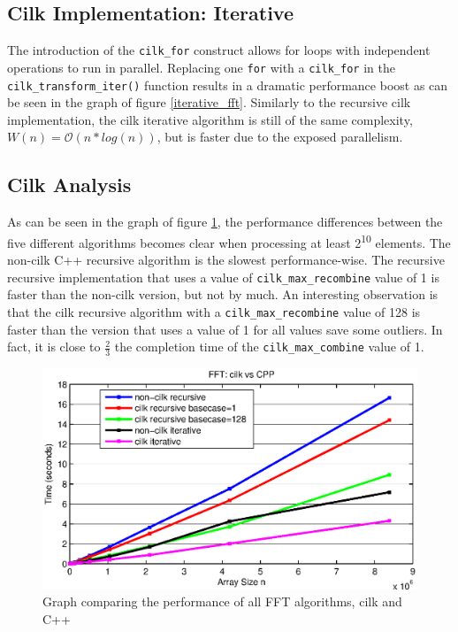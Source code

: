 \subsection{Cilk Implementation: Iterative}
The introduction of the \texttt{cilk\_for} construct allows for loops with independent operations to run in parallel. Replacing one \texttt{for} with a \texttt{cilk\_for} in the \texttt{cilk\_transform\_iter()} function results in a dramatic performance boost as can be seen in the graph of figure \ref{iterative_fft}. 
Similarly to the recursive cilk implementation, the cilk iterative algorithm is still of the same complexity, $W(n) = \mathcal{O}(n * log(n))$, but is faster due to the exposed parallelism. 

\subsection{Cilk Analysis}
As can be seen in the graph of figure \ref{fft_cilk_cpp}, the performance differences between the five different algorithms becomes clear when processing at least 2\textsuperscript{10} elements. The non-cilk C++ recursive algorithm is the slowest performance-wise. The recursive recursive  implementation that uses a value of \texttt{cilk\_max\_recombine} value of 1 is faster than the non-cilk version, but not by much. An interesting observation is that the cilk recursive algorithm with a \texttt{cilk\_max\_recombine} value of 128 is faster than the version that uses a value of 1 for all values save some outliers. In fact, it is close to \( \frac{2}{3} \) the completion time of the \texttt{cilk\_max\_combine} value of 1.

\begin{figure}
\center
\includegraphics[scale=0.8]{img/fft_cilk_cpp.eps}
\caption{Graph comparing the performance of all FFT algorithms, cilk and C++} 
\label{fft_cilk_cpp}
\end{figure}

